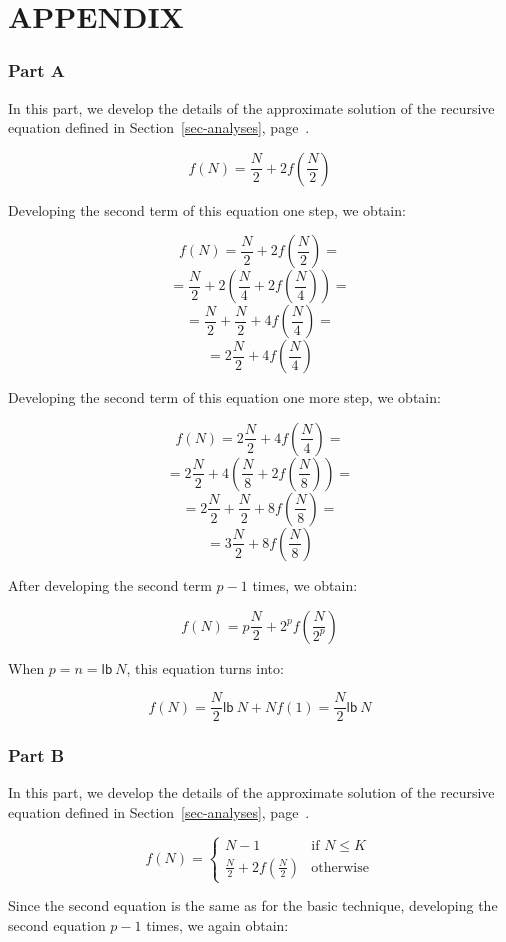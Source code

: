 
\vspace{1em}
\section*{APPENDIX}
\subsubsection*{Part A}
In this part, we develop the details of the approximate solution
of the recursive equation defined in Section~\ref{sec-analyses},
page~\pageref{analyse1}.

\[ f(N) = \frac{N}{2} + 2f(\frac{N}{2}) \]

Developing the second term of this equation one step, we obtain:

\[ f(N) = \frac{N}{2} + 2f(\frac{N}{2}) = \]
\[ = \frac{N}{2} + 2(\frac{N}{4} + 2f(\frac{N}{4})) =\]
\[ = \frac{N}{2} + \frac{N}{2} + 4f(\frac{N}{4}) =\]
\[ = 2\frac{N}{2} + 4f(\frac{N}{4})\]

Developing the second term of this equation one more step, we obtain:

\[ f(N) = 2\frac{N}{2} + 4f(\frac{N}{4}) = \]
\[ = 2\frac{N}{2} + 4(\frac{N}{8} + 2f(\frac{N}{8})) =\]
\[ = 2\frac{N}{2} + \frac{N}{2} + 8f(\frac{N}{8}) =\]
\[ = 3\frac{N}{2} + 8f(\frac{N}{8}) \]

After developing the second term $p-1$ times, we obtain:

\[ f(N) = p\frac{N}{2} + 2^pf(\frac{N}{2^p})\]

When $p = n = \mathsf{lb}~N$, this equation turns into:

\[ f(N) = \frac{N}{2}\mathsf{lb}~N + Nf(1) = \frac{N}{2}\mathsf{lb}~N\]

\subsubsection*{Part B}
In this part, we develop the details of the approximate solution
of the recursive equation defined in Section~\ref{sec-analyses},
page~\pageref{analyse2}.

\[ f(N) = \left\{ \begin{array}{ll}
    N-1 & \mbox{if $N \le K$} \\
    \frac{N}{2} + 2f(\frac{N}{2}) &\mbox{otherwise}
  \end{array} \right. \]

Since the second equation is the same as for the basic technique,
developing the second equation $p-1$ times, we again obtain:

